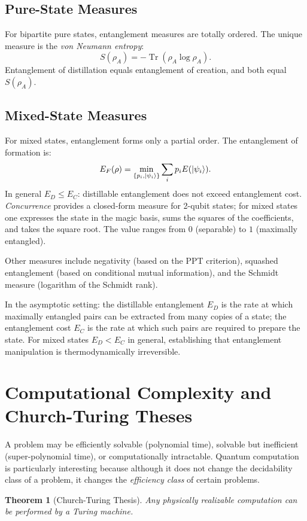 \documentclass[12pt, a4paper, oneside]{report}
\theoremstyle{plain}
\newtheorem{theorem}{Theorem}[chapter]
\theoremstyle{definition}
\theoremstyle{remark}
\DeclareMathOperator{\Tr}{Tr}
\begin{document}
\subsection{Pure-State Measures}

For bipartite pure states, entanglement measures are totally ordered. The unique measure is
the \emph{von Neumann entropy}:
\[
  S(\rho_A) = -\Tr(\rho_A \log \rho_A).
\]
Entanglement of distillation equals entanglement of creation, and both equal $S(\rho_A)$.

\subsection{Mixed-State Measures}

For mixed states, entanglement forms only a partial order. The entanglement of formation is:
\[
  E_F(\rho) = \min_{\{p_i,\ket{\psi_i}\}} \sum_i p_i E(\ket{\psi_i}).
\]
In general $E_D \leq E_C$: distillable entanglement does not exceed entanglement cost.
\emph{Concurrence} provides a closed-form measure for 2-qubit states; for mixed states one
expresses the state in the magic basis, sums the squares of the coefficients, and takes the
square root. The value ranges from $0$ (separable) to $1$ (maximally entangled).

Other measures include negativity (based on the PPT criterion), squashed entanglement (based
on conditional mutual information), and the Schmidt measure (logarithm of the Schmidt rank).

In the asymptotic setting: the distillable entanglement $E_D$ is the rate at which maximally
entangled pairs can be extracted from many copies of a state; the entanglement cost $E_C$ is
the rate at which such pairs are required to prepare the state. For mixed states $E_D < E_C$
in general, establishing that entanglement manipulation is thermodynamically irreversible.


\section{Computational Complexity and Church-Turing Theses}

A problem may be efficiently solvable (polynomial time), solvable but inefficient
(super-polynomial time), or computationally intractable. Quantum computation is particularly
interesting because although it does not change the decidability class of a problem, it changes the \emph{efficiency class} of certain problems.

\begin{theorem}[Church-Turing Thesis]
Any physically realizable computation can be performed by a Turing machine.
\end{theorem}
\end{document}

